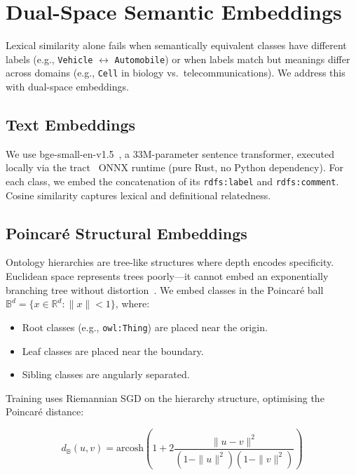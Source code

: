 \documentclass[runningheads]{llncs}
\begin{document}
\section{Dual-Space Semantic Embeddings}
\label{sec:embeddings}

Lexical similarity alone fails when semantically equivalent classes have different labels (e.g., \texttt{Vehicle} $\leftrightarrow$ \texttt{Automobile}) or when labels match but meanings differ across domains (e.g., \texttt{Cell} in biology vs.\ telecommunications). We address this with dual-space embeddings.

\subsection{Text Embeddings}

We use bge-small-en-v1.5~\cite{bge}, a 33M-parameter sentence transformer, executed locally via the tract~\cite{tract} ONNX runtime (pure Rust, no Python dependency). For each class, we embed the concatenation of its \texttt{rdfs:label} and \texttt{rdfs:comment}. Cosine similarity captures lexical and definitional relatedness.

\subsection{Poincar\'e Structural Embeddings}

Ontology hierarchies are tree-like structures where depth encodes specificity. Euclidean space represents trees poorly—it cannot embed an exponentially branching tree without distortion~\cite{poincare}. We embed classes in the Poincar\'e ball $\mathbb{B}^d = \{x \in \mathbb{R}^d : \|x\| < 1\}$, where:

\begin{itemize}
    \item Root classes (e.g., \texttt{owl:Thing}) are placed near the origin.
    \item Leaf classes are placed near the boundary.
    \item Sibling classes are angularly separated.
\end{itemize}

Training uses Riemannian SGD on the hierarchy structure, optimising the Poincar\'e distance:

\begin{equation}
d_{\mathbb{B}}(u, v) = \text{arcosh}\left(1 + 2\frac{\|u - v\|^2}{(1 - \|u\|^2)(1 - \|v\|^2)}\right)
\label{eq:poincare}
\end{equation}
\end{document}
